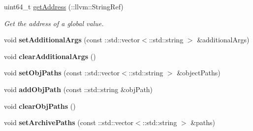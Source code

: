 {\bf }\par
\begin{DoxyCompactItemize}
\item 
uint64\+\_\+t \hyperlink{classbellerophon_1_1engine_1_1ExecutionEngineHelper_a9b72393d74d77555c1306abbdd930007}{get\+Address} (\+::llvm\+::\+String\+Ref)
\begin{DoxyCompactList}\small\item\em Get the address of a global value. \end{DoxyCompactList}\end{DoxyCompactItemize}

{\bf }\par
\begin{DoxyCompactItemize}
\item 
\hypertarget{classbellerophon_1_1engine_1_1ExecutionEngineHelper_a3254d7988bab8088f8cc22d02348748d}{}\label{classbellerophon_1_1engine_1_1ExecutionEngineHelper_a3254d7988bab8088f8cc22d02348748d} 
void {\bfseries set\+Additional\+Args} (const \+::std\+::vector$<$\+::std\+::string $>$ \&additional\+Args)
\item 
\hypertarget{classbellerophon_1_1engine_1_1ExecutionEngineHelper_af81d949184ac251787d6ace27a126302}{}\label{classbellerophon_1_1engine_1_1ExecutionEngineHelper_af81d949184ac251787d6ace27a126302} 
void {\bfseries clear\+Additional\+Args} ()
\item 
\hypertarget{classbellerophon_1_1engine_1_1ExecutionEngineHelper_ab687776f25d2d1aa7bdb200bac479d7f}{}\label{classbellerophon_1_1engine_1_1ExecutionEngineHelper_ab687776f25d2d1aa7bdb200bac479d7f} 
void {\bfseries set\+Obj\+Paths} (const \+::std\+::vector$<$\+::std\+::string $>$ \&object\+Paths)
\item 
\hypertarget{classbellerophon_1_1engine_1_1ExecutionEngineHelper_a824596d478fccec3fd4d81a5dd4dba20}{}\label{classbellerophon_1_1engine_1_1ExecutionEngineHelper_a824596d478fccec3fd4d81a5dd4dba20} 
void {\bfseries add\+Obj\+Path} (const \+::std\+::string \&obj\+Path)
\item 
\hypertarget{classbellerophon_1_1engine_1_1ExecutionEngineHelper_a555b5658918f2a14cbb03062531fdc24}{}\label{classbellerophon_1_1engine_1_1ExecutionEngineHelper_a555b5658918f2a14cbb03062531fdc24} 
void {\bfseries clear\+Obj\+Paths} ()
\item 
\hypertarget{classbellerophon_1_1engine_1_1ExecutionEngineHelper_ae256ea25e5844f8411911d5979af2a77}{}\label{classbellerophon_1_1engine_1_1ExecutionEngineHelper_ae256ea25e5844f8411911d5979af2a77} 
void {\bfseries set\+Archive\+Paths} (const \+::std\+::vector$<$\+::std\+::string $>$ \&paths)

\end{DoxyCompactItemize}

